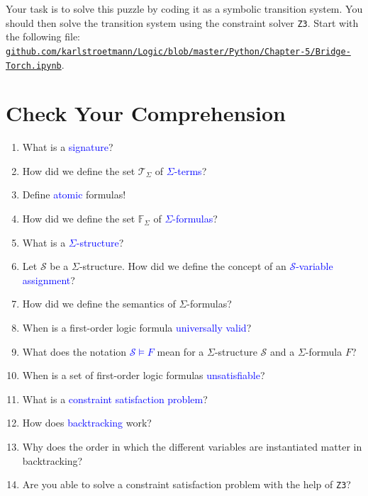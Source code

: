 \noindent
Your task is to solve this puzzle by coding it as a symbolic transition system.  You should then solve the
transition system using the constraint solver \texttt{Z3}.
Start with the following file:
\\[0.2cm]
\href{https://github.com/karlstroetmann/Logic/blob/master/Python/Chapter-5/Bridge-Torch.ipynb}{\small\texttt{github.com/karlstroetmann/Logic/blob/master/Python/Chapter-5/Bridge-Torch.ipynb}}.
\eox


\section{Check Your Comprehension}
\begin{enumerate}
\item What is a \textcolor{blue}{signature}?
\item How did we define the set $\mathcal{T}_\Sigma$ of \textcolor{blue}{$\Sigma$-terms}?
\item Define \textcolor{blue}{atomic} formulas!
\item How did we define the set $\mathbb{F}_\Sigma$ of \textcolor{blue}{$\Sigma$-formulas}?
\item What is a \textcolor{blue}{$\Sigma$-structure}?
\item Let $\mathcal{S}$ be a $\Sigma$-structure. How did we define the concept of
      an \textcolor{blue}{$\mathcal{S}$-variable assignment}?
\item How did we define the semantics of $\Sigma$-formulas?
\item When is a first-order logic formula \textcolor{blue}{universally valid}?
\item What does the notation \textcolor{blue}{$\mathcal{S} \models F$} mean for a $\Sigma$-structure $\mathcal{S}$ and a
      $\Sigma$-formula $F$?
\item When is a set of first-order logic formulas \textcolor{blue}{unsatisfiable}?
\item What is a \textcolor{blue}{constraint satisfaction problem}?
\item How does \textcolor{blue}{backtracking} work?
\item Why does the order in which the different variables are instantiated matter in backtracking?
\item Are you able to solve a constraint satisfaction problem with the help of \texttt{Z3}?
\end{enumerate}

